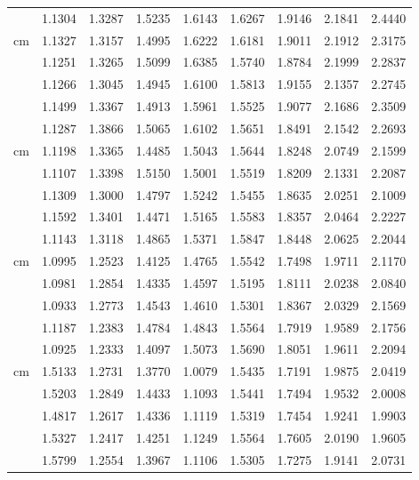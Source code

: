 \begin{tabular}{r *4{c} @{\hspace{3.5\tabcolsep}}*4{c}}
&1.1304 &1.3287 &1.5235 &1.6143 &1.6267 &1.9146 &2.1841 &2.4440\\[5 pt]
\multirow{5}{*}{\unit[80--100]{cm}}
&1.1327 &1.3157 &1.4995 &1.6222 &1.6181 &1.9011 &2.1912 &2.3175\\
&1.1251 &1.3265 &1.5099 &1.6385 &1.5740 &1.8784 &2.1999 &2.2837\\
&1.1266 &1.3045 &1.4945 &1.6100 &1.5813 &1.9155 &2.1357 &2.2745\\
&1.1499 &1.3367 &1.4913 &1.5961 &1.5525 &1.9077 &2.1686 &2.3509\\
&1.1287 &1.3866 &1.5065 &1.6102 &1.5651 &1.8491 &2.1542 &2.2693\\[5 pt]
\multirow{5}{*}{\unit[90--110]{cm}}
&1.1198 &1.3365 &1.4485 &1.5043 &1.5644 &1.8248 &2.0749 &2.1599\\
&1.1107 &1.3398 &1.5150 &1.5001 &1.5519 &1.8209 &2.1331 &2.2087\\
&1.1309 &1.3000 &1.4797 &1.5242 &1.5455 &1.8635 &2.0251 &2.1009\\
&1.1592 &1.3401 &1.4471 &1.5165 &1.5583 &1.8357 &2.0464 &2.2227\\
&1.1143 &1.3118 &1.4865 &1.5371 &1.5847 &1.8448 &2.0625 &2.2044\\[5 pt]
\multirow{5}{*}{\unit[100--120]{cm}}
&1.0995 &1.2523 &1.4125 &1.4765 &1.5542 &1.7498 &1.9711 &2.1170\\
&1.0981 &1.2854 &1.4335 &1.4597 &1.5195 &1.8111 &2.0238 &2.0840\\
&1.0933 &1.2773 &1.4543 &1.4610 &1.5301 &1.8367 &2.0329 &2.1569\\
&1.1187 &1.2383 &1.4784 &1.4843 &1.5564 &1.7919 &1.9589 &2.1756\\
&1.0925 &1.2333 &1.4097 &1.5073 &1.5690 &1.8051 &1.9611 &2.2094\\[5 pt]
\multirow{5}{*}{\unit[110--130]{cm}}
&1.5133 &1.2731 &1.3770 &1.0079 &1.5435 &1.7191 &1.9875 &2.0419\\
&1.5203 &1.2849 &1.4433 &1.1093 &1.5441 &1.7494 &1.9532 &2.0008\\
&1.4817 &1.2617 &1.4336 &1.1119 &1.5319 &1.7454 &1.9241 &1.9903\\
&1.5327 &1.2417 &1.4251 &1.1249 &1.5564 &1.7605 &2.0190 &1.9605\\
&1.5799 &1.2554 &1.3967 &1.1106 &1.5305 &1.7275 &1.9141 &2.0731
\end{tabular}